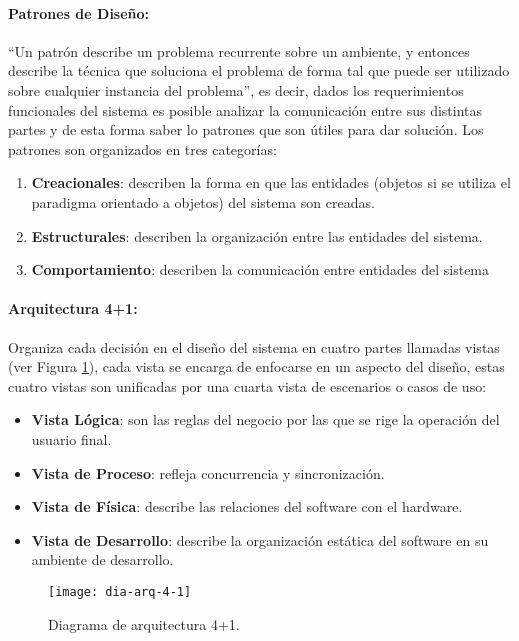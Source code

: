 \paragraph{Patrones de Diseño:} ``Un patrón describe un problema recurrente sobre un ambiente, y entonces describe la técnica que soluciona el problema de forma tal que puede ser utilizado sobre cualquier instancia del problema''\cite{DesignPatterns}, es decir, dados los requerimientos funcionales del sistema es posible analizar la comunicación entre sus distintas partes y de esta forma saber lo patrones que son útiles para dar solución. Los patrones son organizados en tres categorías:
\begin{enumerate}
	\item \textbf{Creacionales}: describen la forma en que las entidades (objetos si se utiliza el paradigma orientado a objetos) del sistema son creadas.
	\item \textbf{Estructurales}: describen la organización entre las entidades del sistema.
	\item \textbf{Comportamiento}: describen la comunicación entre entidades del sistema
\end{enumerate}
\paragraph{Arquitectura 4+1:} Organiza cada decisión en el diseño del sistema en cuatro partes llamadas vistas (ver Figura \ref{fig:dia-arq-4-1}), cada vista se encarga de enfocarse en un aspecto del diseño, estas cuatro vistas son unificadas por una cuarta vista de escenarios o casos de uso\cite{ViewModel4plus1}:
\begin{itemize}
	\item \textbf{Vista Lógica}: son las reglas del negocio por las que se rige la operación del usuario final.
	\item \textbf{Vista de Proceso}: refleja concurrencia y sincronización.
	\item \textbf{Vista de Física}: describe las relaciones del software con el hardware.
	\item \textbf{Vista de Desarrollo}: describe la organización estática del software en su ambiente de desarrollo.
\end{itemize}

\begin{figure}[h]
\centering
\texttt{[image: dia-arq-4-1]} 
\caption{Diagrama de arquitectura 4+1.\cite{ViewModel4plus1}}
\label{fig:dia-arq-4-1}
\end{figure}


